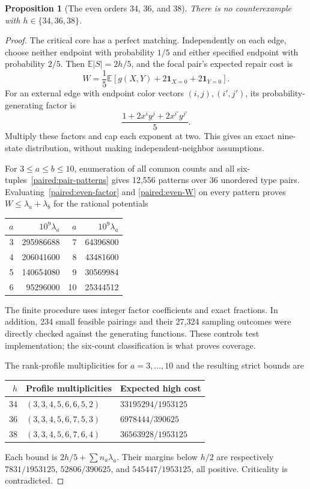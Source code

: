 \documentclass[11pt,a4paper]{article}
\newtheorem{proposition}[theorem]{Proposition}
\theoremstyle{definition}\newtheorem{definition}[theorem]{Definition}
\theoremstyle{remark}\newtheorem{remark}[theorem]{Remark}
\begin{document}
\begin{proposition}[The even orders 34, 36, and 38]\label{paired:even-sampler}
There is no counterexample with $h\in\{34,36,38\}$.
\end{proposition}
\begin{proof}
The critical core has a perfect matching. Independently on each edge,
choose neither endpoint with probability $1/5$ and either specified
endpoint with probability $2/5$. Then $\mathbb E|S|=2h/5$, and the
focal pair's expected repair cost is
\begin{equation}\label{paired:even-W}
 W=\frac15\mathbb E\left[g(X,Y)+2\mathbf1_{X=0}+2\mathbf1_{Y=0}\right].
\end{equation}
For an external edge with endpoint color vectors $(i,j),(i',j')$,
its probability-generating factor is
\begin{equation}\label{paired:even-factor}
 \frac{1+2x^iy^j+2x^{i'}y^{j'}}5.
\end{equation}
Multiply these factors and cap each exponent at two. This gives an
exact nine-state distribution, without making independent-neighbor
assumptions.

For $3\le a\le b\le10$, enumeration of all common counts and all
six-tuples~\eqref{paired:pair-patterns} gives 12,556 patterns over
36 unordered type pairs. Evaluating~\eqref{paired:even-factor} and
\eqref{paired:even-W} on every pattern proves
$W\le\lambda_a+\lambda_b$ for the rational potentials
\begin{center}\small
\begin{tabular}{rr@{\qquad}rr}
\toprule
$a$&$10^9\lambda_a$&$a$&$10^9\lambda_a$\\\midrule
3&295986688&7&64396800\\
4&206041600&8&43481600\\
5&140654080&9&30569984\\
6&95296000&10&25344512\\\bottomrule
\end{tabular}
\end{center}
The finite procedure uses integer factor coefficients and exact
fractions. In addition, 234 small feasible pairings and their 27,324
sampling outcomes were directly checked against the generating
functions. These controls test implementation; the six-count
classification is what proves coverage.

The rank-profile multiplicities for $a=3,\ldots,10$ and the resulting
strict bounds are
\begin{center}\small
\begin{tabular}{rll}
\toprule
$h$&Profile multiplicities&Expected high cost\\\midrule
34&$(3,3,4,5,6,6,5,2)$&$33195294/1953125$\\
36&$(3,3,4,5,6,7,5,3)$&$6978444/390625$\\
38&$(3,3,4,5,6,7,6,4)$&$36563928/1953125$\\\bottomrule
\end{tabular}
\end{center}
Each bound is $2h/5+\sum n_a\lambda_a$. Their margins below $h/2$
are respectively $7831/1953125$, $52806/390625$, and
$545447/1953125$, all positive. Criticality is contradicted.
\end{proof}
\end{document}
